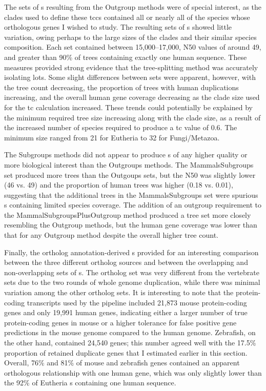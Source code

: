 The sets of \subtr{}s resulting from the Outgroup methods were of
special interest, as the clades used to define these \acp{tcc}
contained all or nearly all of the \mammln species whose orthologous
genes I wished to study. The resulting sets of \subtr{}s showed little
variation, owing perhaps to the large sizes of the clades and their
similar species composition. Each \subtr set contained between
15,000--17,000, N50 values of around 49, and greater
than 90\% of trees containing exactly one human sequence. These
measures provided strong evidence that the tree-splitting method was
accurately isolating \mammln \acp{lot}.  Some slight differences
between \subtr sets were apparent, however, with the tree count
decreasing, the proportion of trees with human duplications
increasing, and the overall human gene coverage decreasing as the
clade size used for the \ac{tc} calculation increased. These trends
could potentially be explained by the minimum required tree size
increasing along with the clade size, as a result of the increased
number of species required to produce a \ac{tc} value of 0.6. The
minimum \subtr size ranged from 21 for Eutheria to 32 for
Fungi/Metazoa.

The Subgroups methods did not appear to produce \subtr{}s of any
higher quality or more biological interest than the Outgroups
methods. The MammalsSubgroups set produced more trees than the
Outgoups sets, but the N50 was slightly lower (46 vs. 49) and the
proportion of \zcop human trees was higher (0.18 vs. 0.01), suggesting
that the additional trees in the MammalsSubgroups set were spurious
\subtr{}s containing limited species coverage. The addition of an
outgroup requirement to the \mbox{MammalSubgroupsPlusOutgroup} method
produced a tree set more closely resembling the Outgroup methods, but
the human gene coverage was lower than that for any Outgroup method
despite the overall higher tree count.

Finally, the ortholog annotation-derived \subtr{}s provided for an
interesting comparison between the three different ortholog sources
and between the overlapping and non-overlapping sets of \subtr{}s. The
 ortholog set was very different from the
vertebrate sets due to the two rounds of whole genome duplication,
while there was minimal variation among the other ortholog sets. It is
interesting to note that the protein-coding transcripts used by the
\cmp pipeline included 21,873 mouse protein-coding genes and only
19,991 human genes, indicating either a larger number of true
protein-coding genes in mouse or a higher tolerance for false positive
gene predictions in the mouse genome compared to the human
genome. Zebrafish, on the other hand, contained 24,540 genes; this
number agreed well with the 17.5\% proportion of retained duplicate
genes that I estimated earlier in this section. Overall, 76\% and 81\%
of mouse and zebrafish genes contained an apparent orthologous
relationship with one human gene, which was only slightly lower than
the 92\% of Eutheria \subtr{}s containing one human sequence.


